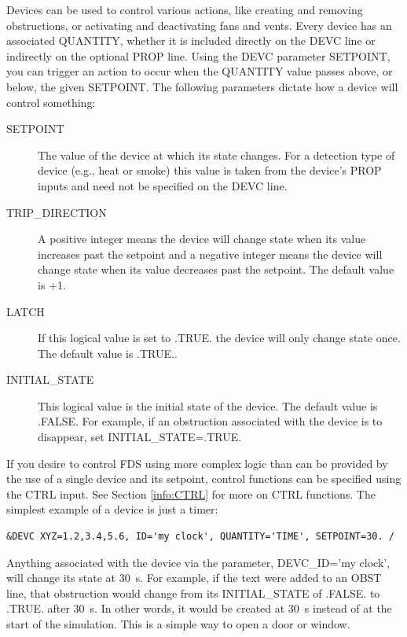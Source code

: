 \documentclass[11pt]{book}
\begin{document}
Devices can be used to control various actions, like creating and removing obstructions, or activating and deactivating
fans and vents. Every device has an associated {\ct QUANTITY}, whether it is included directly on the {\ct DEVC} line or
indirectly on the optional {\ct PROP} line. Using the {\ct DEVC} parameter {\ct SETPOINT}, you can trigger an action to
occur when the {\ct QUANTITY} value passes above, or below, the given {\ct SETPOINT}.
The following parameters dictate how a device will control something:
\begin{description}
\item[{\ct SETPOINT}] The value of the device at which its state changes.  For a detection type of device
(e.g., heat or smoke) this value is taken from the device's {\ct PROP} inputs and need not be specified on the {\ct DEVC} line.
\item[{\ct TRIP\_DIRECTION}] A positive integer means the device will change state when its value increases
past the setpoint and a negative integer means the device will change state
when its value decreases past the setpoint.  The default value is +1.
\item[{\ct LATCH}] If this logical value is set to {\ct .TRUE.} the device will only change state once.
The default value is {\ct .TRUE.}.
\item[{\ct INITIAL\_STATE}] This logical value is the initial state of the device. The default value
is {\ct .FALSE.} For example, if an obstruction associated with the device is to disappear, set {\ct INITIAL\_STATE=.TRUE.}
\end{description}
If you desire to control FDS using more complex logic than can be provided
by the use of a single device and its setpoint, control functions can be specified using the {\ct CTRL} input.
See Section \ref{info:CTRL} for more on {\ct CTRL} functions.
The simplest example of a device is just a timer:

\begin{lstlisting}
&DEVC XYZ=1.2,3.4,5.6, ID='my clock', QUANTITY='TIME', SETPOINT=30. /
\end{lstlisting}

\noindent
Anything associated with the device via the parameter, {\ct DEVC\_ID='my clock'}, will change its state at 30~s. For example,
if the text were added to an {\ct OBST} line, that obstruction would change from its {\ct INITIAL\_STATE} of {\ct .FALSE.} to {\ct .TRUE.} after
30~s. In other words, it would be created at 30~s instead of at the start of the simulation. This is a simple way to open a door or window.
\end{document}
